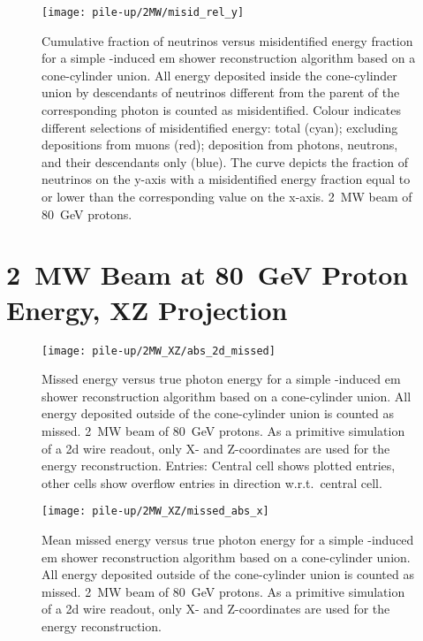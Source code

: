 \begin{figure}[tbp]
	\centering
	\texttt{[image: pile-up/2MW/misid\_rel\_y]}
	\caption[Pile-up study neutrino vs.\ misidentified energy fraction, \SI{2}{\mega\watt} beam]{%
		Cumulative fraction of neutrinos versus misidentified energy fraction for a simple \Pgpz-induced \acrshort{em} shower reconstruction algorithm based on a cone-cylinder union.
		All energy deposited inside the cone-cylinder union by descendants of neutrinos different from the parent of the corresponding \Pgpz photon is counted as misidentified.
		Colour indicates different selections of misidentified energy: total (cyan); excluding depositions from muons (red); deposition from photons, neutrons, and their descendants only (blue).
		The curve depicts the fraction of neutrinos on the y-axis with a misidentified energy fraction equal to or lower than the corresponding value on the x-axis.
		\SI{2}{\mega\watt} beam of \SI{80}{\giga\electronvolt} protons.
	}
\end{figure}


\clearpage
\section{\SI{2}{\mega\watt} Beam at \SI{80}{\giga\electronvolt} Proton Energy, XZ Projection}

\begin{figure}[htbp]
	\centering
	\texttt{[image: pile-up/2MW\_XZ/abs\_2d\_missed]}
	\caption[Pile-up study missed vs.\ true photon energy, \SI{2}{\mega\watt} beam, XZ projection]{%
		Missed energy versus true photon energy for a simple \Pgpz-induced \acrshort{em} shower reconstruction algorithm based on a cone-cylinder union.
		All energy deposited outside of the cone-cylinder union is counted as missed.
		\SI{2}{\mega\watt} beam of \SI{80}{\giga\electronvolt} protons.
		As a primitive simulation of a \acrshort{2d} wire readout, only X- and Z-coordinates are used for the energy reconstruction.
		Entries: Central cell shows plotted entries, other cells show overflow entries in direction w.r.t.\ central cell.
	}
\end{figure}

\begin{figure}[tbp]
	\centering
	\texttt{[image: pile-up/2MW\_XZ/missed\_abs\_x]}
	\caption[Pile-up study mean missed vs.\ true photon energy, \SI{2}{\mega\watt} beam, XZ projection]{%
		Mean missed energy versus true photon energy for a simple \Pgpz-induced \acrshort{em} shower reconstruction algorithm based on a cone-cylinder union.
		All energy deposited outside of the cone-cylinder union is counted as missed.
		\SI{2}{\mega\watt} beam of \SI{80}{\giga\electronvolt} protons.
		As a primitive simulation of a \acrshort{2d} wire readout, only X- and Z-coordinates are used for the energy reconstruction.
	}
\end{figure}

